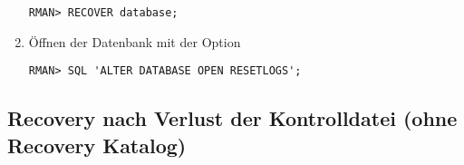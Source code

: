 \begin{enumerate}
              \begin{lstlisting}[caption={Recovern der Datenbank},label=admin1514,language=rman]
RMAN> RECOVER database;
              \end{lstlisting}
            \item Öffnen der Datenbank mit der Option 
              \begin{lstlisting}[caption={Datenbank mit open resetlogs öffnen},label=admin1515,language=rman,emph={[9]ALTER,DATABASE,OPEN,RESETLOGS},emphstyle={[9]\color{magenta}\bfseries}]
RMAN> SQL 'ALTER DATABASE OPEN RESETLOGS';
              \end{lstlisting}
            \end{enumerate}
\clearpage
      \subsection{Recovery nach Verlust der Kontrolldatei (ohne Recovery Katalog)}

